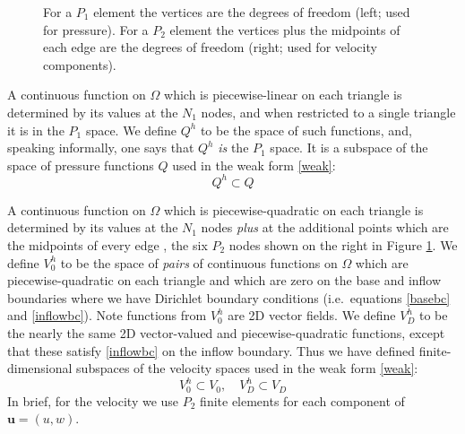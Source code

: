 \documentclass[letterpaper,final,12pt,reqno]{amsart}
\newcommand{\bu}{\mathbf{u}}
\begin{document}
\begin{figure}[ht]
\caption{For a $P_1$ element the vertices are the degrees of freedom (left; used for pressure).  For a $P_2$ element the vertices plus the midpoints of each edge are the degrees of freedom (right; used for velocity components).}
\label{fig:fedofs}
\end{figure}

A continuous function on $\Omega$ which is piecewise-linear on each triangle is determined by its values at the $N_1$ nodes, and when restricted to a single triangle it is in the $P_1$ space.  We define $Q^h$ to be the space of such functions, and, speaking informally, one says that $Q^h$ \emph{is} the $P_1$ space.  It is a subspace of the space of pressure functions $Q$ used in the weak form \eqref{weak}:
    $$Q^h \subset Q$$ 

A continuous function on $\Omega$ which is piecewise-quadratic on each triangle is determined by its values at the $N_1$ nodes \emph{plus} at the additional points which are the midpoints of every edge \cite{Elmanetal2014}, the six $P_2$ nodes shown on the right in Figure \ref{fig:fedofs}.  We define $V_0^h$ to be the space of \emph{pairs} of continuous functions on $\Omega$ which are piecewise-quadratic on each triangle and which are zero on the base and inflow boundaries where we have Dirichlet boundary conditions (i.e.~equations \eqref{basebc} and \eqref{inflowbc}).  Note functions from $V_0^h$ are 2D vector fields.  We define $V_D^h$ to be the nearly the same 2D vector-valued and piecewise-quadratic functions, except that these satisfy \eqref{inflowbc} on the inflow boundary.  Thus we have defined finite-dimensional subspaces of the velocity spaces used in the weak form \eqref{weak}:
    $$V_0^h \subset V_0, \quad V_D^h \subset V_D$$
In brief, for the velocity we use $P_2$ finite elements for each component of $\bu=(u,w)$.
\end{document}
